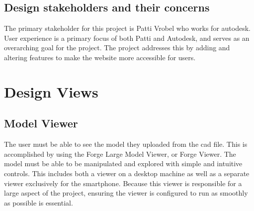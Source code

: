 \documentclass[letterpaper, 10pt, draftclsnofoot, compsoc, onecolumn]{IEEEtran}
\begin{document}
\subsection{Design stakeholders and their concerns}
	The primary stakeholder for this project is Patti Vrobel who works for autodesk. User experience is a primary focus of both Patti and Autodesk, and serves as an overarching goal for the project. The project addresses this by adding and altering features to make the website more accessible for users.

\section{Design Views}

\subsection{Model Viewer}
\label{modelView}
The user must be able to see the model they uploaded from the cad file. This is accomplished by using the Forge Large Model Viewer, or Forge Viewer. The model must be able to be manipulated and explored with simple and intuitive controls. This includes both a viewer on a desktop machine as well as a separate viewer exclusively for the smartphone. Because this viewer is responsible for a large aspect of the project, ensuring the viewer is configured to run as smoothly as possible is essential.
\end{document}
